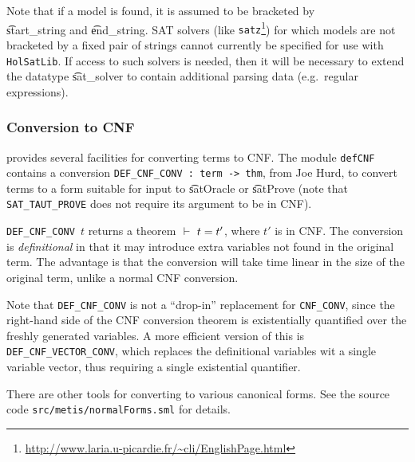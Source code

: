\medskip

Note that if a model is found, it is assumed to be bracketed
by \\ \t{start\_string} and \t{end\_string}. SAT solvers 
(like {\tt satz}\footnote{\url{http://www.laria.u-picardie.fr/~cli/EnglishPage.html}})
for which models are not bracketed by a fixed pair of strings cannot currently
be specified for use with {\tt HolSatLib}. If access to such solvers is needed, then
it will be necessary to extend the datatype \t{sat\_solver} to contain
additional parsing data (e.g.~regular expressions).

\subsubsection{Conversion to CNF}

\HOL{} provides several facilities for converting terms to CNF. The module {\tt defCNF} contains a  conversion  {\tt DEF\_CNF\_CONV : term -> thm}, from Joe Hurd, to convert \HOL{} terms to a form suitable for input to \t{satOracle} or \t{satProve} (note that {\tt SAT\_TAUT\_PROVE} does not require its argument to be in CNF). 

{\small\verb+DEF_CNF_CONV+}~$t$ returns a theorem $\ \vdash\  t = t'$,
where $t'$ is in CNF. The conversion is {\it definitional} in that it may introduce extra variables not found in the original term. The advantage is that the conversion will take time linear in the size of the original term, unlike a normal CNF conversion. 

Note that {\tt DEF\_CNF\_CONV} is not a ``drop-in'' replacement for {\tt CNF\_CONV}, since the right-hand side of the CNF conversion theorem is existentially quantified over the freshly generated variables. A more efficient version of this is {\tt DEF\_CNF\_VECTOR\_CONV}, which replaces the definitional variables wit a single variable vector, thus requiring a single existential quantifier.

There are other tools for converting to various canonical forms. See the source code
{\small\verb+src/metis/normalForms.sml+} for details.


%
